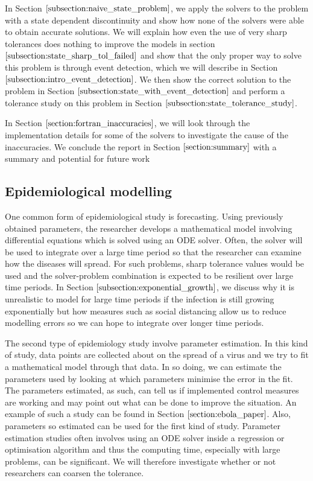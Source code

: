 In Section $\ref{subsection:naive_state_problem}$, we apply the solvers to the problem with a state dependent discontinuity and show how none of the solvers were able to obtain accurate solutions. We will explain how even the use of very sharp tolerances does nothing to improve the models in section $\ref{subsection:state_sharp_tol_failed}$ and show that the only proper way to solve this problem is through event detection, which we will describe in Section $\ref{subsection:intro_event_detection}$. We then show the correct solution to the problem in Section $\ref{subsection:state_with_event_detection}$ and perform a tolerance study on this problem in Section $\ref{subsection:state_tolerance_study}$.

In Section $\ref{section:fortran_inaccuracies}$, we will look through the implementation details for some of the solvers to investigate the cause of the inaccuracies. We conclude the report in Section $\ref{section:summary}$ with a summary and potential for future work

\subsection{Epidemiological modelling}
\label{subsection:research_papers}
One common form of epidemiological study is forecasting. Using previously obtained parameters, the researcher develops a mathematical model involving differential equations which is solved using an ODE solver. Often, the solver will be used to integrate over a large time period so that the researcher can examine how the diseases will spread. For such problems, sharp tolerance values would be used and the solver-problem combination is expected to be resilient over large time periods. In Section $\ref{subsection:exponential_growth}$, we discuss why it is unrealistic to model for large time periods if the infection is still growing exponentially but how measures such as social distancing allow us to reduce modelling errors so we can hope to integrate over longer time periods.

The second type of epidemiology study involve parameter estimation. In this kind of study, data points are collected about on the spread of a virus and we try to fit a mathematical model through that data. In so doing, we can estimate the parameters used by looking at which parameters minimise the error in the fit. The parameters estimated, as such, can tell us if implemented control measures are working and may point out what can be done to improve the situation. An example of such a study can be found in Section $\ref{section:ebola_paper}$. Also, parameters so estimated can be used for the first kind of study. Parameter estimation studies often involves using an ODE solver inside a regression or optimisation algorithm and thus the computing time, especially with large problems, can be significant. We will therefore investigate whether or not researchers can coarsen the tolerance.

